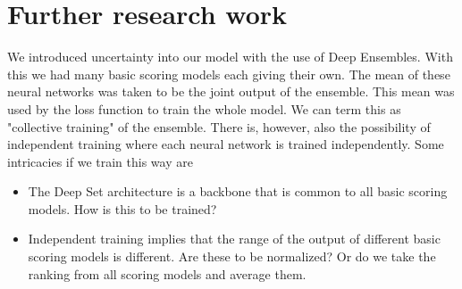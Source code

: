 \documentclass[12pt, twoside, ngerman]{report}
\begin{document}

\section{Further research work}

We introduced uncertainty into our model with the use of Deep Ensembles. 
With this we had many basic scoring models each giving their own.
The mean of these neural networks was taken to be the joint output of the
ensemble.
This mean was used by the loss function to train the whole model.
We can term this as "collective training" of the ensemble.
There is,  however,  also the possibility of independent training where each neural network is trained independently.
Some intricacies if we train this way are
\begin{itemize}
\item The Deep Set architecture is a backbone that is common to all basic scoring models.  How is this to be trained?
\item Independent training implies that the range of the output of different basic scoring models is different. 
Are these to be normalized? Or do we take the ranking from all scoring models and average them.
\end{itemize}
\end{document}
